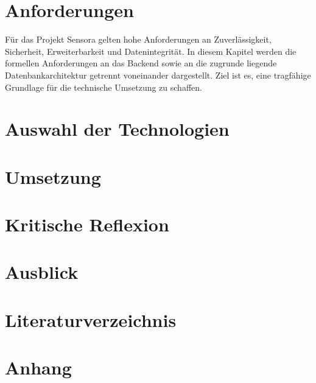 \documentclass[a4paper,12pt]{report}
\begin{document}
	\chapter{Anforderungen}
    Für das Projekt Sensora gelten hohe Anforderungen an Zuverlässigkeit, Sicherheit, Erweiterbarkeit und Datenintegrität. In diesem Kapitel werden die formellen Anforderungen an das Backend sowie an die zugrunde liegende Datenbankarchitektur getrennt voneinander dargestellt. Ziel ist es, eine tragfähige Grundlage für die technische Umsetzung zu schaffen.
  
  
	\newpage
	\chapter{Auswahl der Technologien}
  
	
	
	\newpage
	\chapter{Umsetzung}
  
	
	\newpage
	
	
	\chapter{Kritische Reflexion}
	\newpage 
	\chapter{Ausblick}
	\newpage
	
	\newpage
	\pagestyle{fancy}

	\chapter*{Literaturverzeichnis}
	\printbibliography
	\newpage

	\cleardoublepage

	\chapter*{Anhang}


\newpage

	
\end{document}
